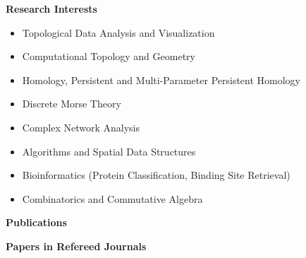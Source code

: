 \documentclass[11pt]{article}
\begin{document}
\noindent
{\Large\bf Research Interests}

\begin{itemize}

\item Topological Data Analysis and Visualization
\item Computational Topology and Geometry
\item Homology, Persistent and Multi-Parameter Persistent Homology
\item Discrete Morse Theory
\item Complex Network Analysis
\item Algorithms and Spatial Data Structures
\item Bioinformatics (Protein Classification, Binding Site Retrieval)
\item Combinatorics and Commutative Algebra

\end {itemize}






\vspace*{3ex}
\noindent
{\Large\bf Publications}

\vspace*{1.5ex}

\noindent
{\bf Papers in Refereed Journals}
\end{document}
